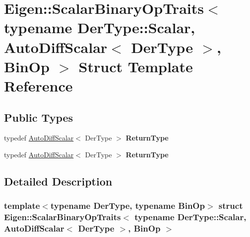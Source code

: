 \hypertarget{struct_eigen_1_1_scalar_binary_op_traits_3_01typename_01_der_type_1_1_scalar_00_01_auto_diff_sca5c26207d328bbaa3069a04f38248d36b}{}\section{Eigen\+:\+:Scalar\+Binary\+Op\+Traits$<$ typename Der\+Type\+:\+:Scalar, Auto\+Diff\+Scalar$<$ Der\+Type $>$, Bin\+Op $>$ Struct Template Reference}
\label{struct_eigen_1_1_scalar_binary_op_traits_3_01typename_01_der_type_1_1_scalar_00_01_auto_diff_sca5c26207d328bbaa3069a04f38248d36b}
\subsection*{Public Types}
\begin{DoxyCompactItemize}
\item 
\mbox{\label{struct_eigen_1_1_scalar_binary_op_traits_3_01typename_01_der_type_1_1_scalar_00_01_auto_diff_sca5c26207d328bbaa3069a04f38248d36b_a5f2f186ee03a4f32839029d3503807e9}} 
typedef \hyperlink{class_eigen_1_1_auto_diff_scalar}{Auto\+Diff\+Scalar}$<$ Der\+Type $>$ {\bfseries Return\+Type}
\item 
\mbox{\label{struct_eigen_1_1_scalar_binary_op_traits_3_01typename_01_der_type_1_1_scalar_00_01_auto_diff_sca5c26207d328bbaa3069a04f38248d36b_a5f2f186ee03a4f32839029d3503807e9}} 
typedef \hyperlink{class_eigen_1_1_auto_diff_scalar}{Auto\+Diff\+Scalar}$<$ Der\+Type $>$ {\bfseries Return\+Type}
\end{DoxyCompactItemize}


\subsection{Detailed Description}
\subsubsection*{template$<$typename Der\+Type, typename Bin\+Op$>$\newline
struct Eigen\+::\+Scalar\+Binary\+Op\+Traits$<$ typename Der\+Type\+::\+Scalar, Auto\+Diff\+Scalar$<$ Der\+Type $>$, Bin\+Op $>$}



